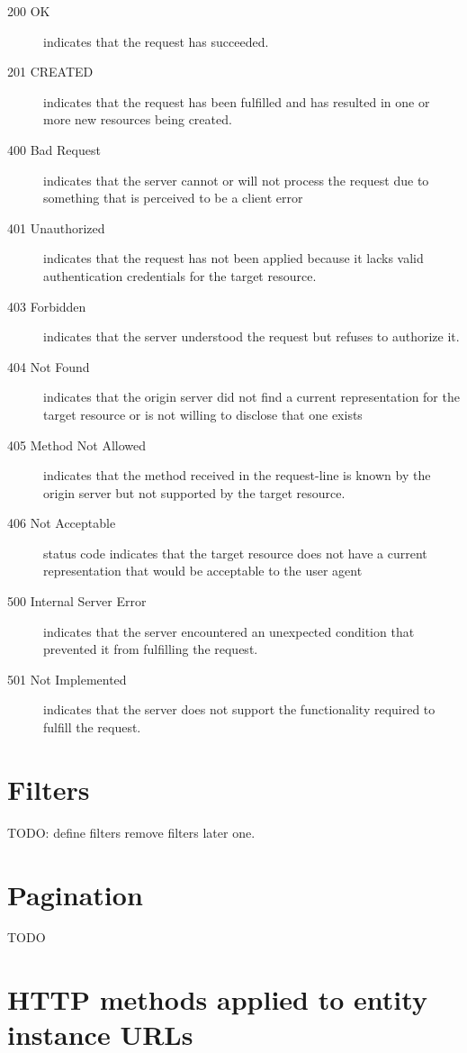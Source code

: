 \documentclass[10pt,a4paper]{article}
\begin{document}
\begin{description}
\item[200 OK] indicates that the request has succeeded.
\item[201 CREATED] indicates that the request has been fulfilled and has resulted in one or more new resources being created.
\item[400 Bad Request] indicates that the server cannot or will not process the request due to something that is perceived to be a client error
\item[401 Unauthorized] indicates that the request has not been applied because it lacks valid authentication credentials for the target resource.
\item[403 Forbidden] indicates that the server understood the request but refuses to authorize it.
\item[404 Not Found] indicates that the origin server did not find a current representation for the target resource or is not willing to disclose that one exists
\item[405 Method Not Allowed] indicates that the method received in the request-line is known by the origin server but not supported by the target resource.
\item[406 Not Acceptable] status code indicates that the target resource does not have a current representation that would be acceptable to the user agent
\item[500 Internal Server Error] indicates that the server encountered an unexpected condition that prevented it from fulfilling the request.
\item[501 Not Implemented] indicates that the server does not support the functionality required to fulfill the request.
\end{description}

\section{Filters}

TODO: define filters
remove filters later one.

\section{Pagination}

TODO

\section{HTTP methods applied to entity instance URLs}
\end{document}
